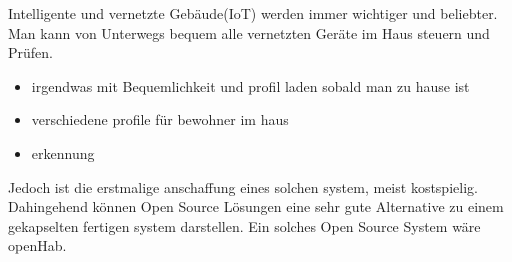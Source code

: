 Intelligente und vernetzte Gebäude(IoT) werden immer wichtiger und beliebter.
Man kann von Unterwegs bequem alle vernetzten Geräte im Haus steuern und Prüfen.
\begin{itemize}
      \item irgendwas mit Bequemlichkeit und profil laden sobald man zu hause ist
      \item verschiedene profile für bewohner im haus
			\item erkennung
\end{itemize}

Jedoch ist die erstmalige anschaffung eines solchen system, meist kostspielig.
Dahingehend können Open Source Lösungen eine sehr gute Alternative zu einem gekapselten fertigen system darstellen.
Ein solches Open Source System wäre openHab.